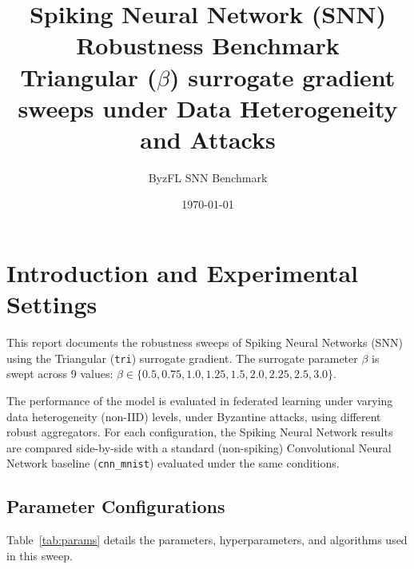 \documentclass{article}
\title{Spiking Neural Network (SNN) Robustness Benchmark\\Triangular ($\beta$) surrogate gradient sweeps under Data Heterogeneity and Attacks}
\author{ByzFL SNN Benchmark}
\date{\today}
\begin{document}
\maketitle

\clearpage
\tableofcontents
\clearpage

\section{Introduction and Experimental Settings}
This report documents the robustness sweeps of Spiking Neural Networks (SNN) using the Triangular (\texttt{tri}) surrogate gradient. The surrogate parameter $\beta$ is swept across 9 values: $\beta \in \{0.5, 0.75, 1.0, 1.25, 1.5, 2.0, 2.25, 2.5, 3.0\}$.

The performance of the model is evaluated in federated learning under varying data heterogeneity (non-IID) levels, under Byzantine attacks, using different robust aggregators. For each configuration, the Spiking Neural Network results are compared side-by-side with a standard (non-spiking) Convolutional Neural Network baseline (\texttt{cnn\_mnist}) evaluated under the same conditions.

\subsection{Parameter Configurations}
Table~\ref{tab:params} details the parameters, hyperparameters, and algorithms used in this sweep.
\end{document}

